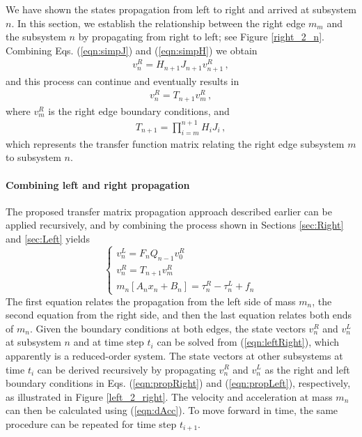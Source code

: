 \documentclass[11pt]{ucthesis}
\newcommand{\beq}{\begin{equation}}
\newcommand{\eeq}{\end{equation}}
\begin{document}
We have shown the states propagation from left to right and arrived at subsystem $n$. In this section, we establish the relationship between the right edge $m_m$ and the subsystem $n$ by propagating from right to left; see Figure \ref{right_2_n}. Combining Eqs. (\ref{eqn:simpJ}) and (\ref{eqn:simpH}) we obtain
\begin{eqnarray}
v_{n}^R = H_{n+1} J_{n+1} v_{n+1}^R \,,
\label{eqn:propLeft}
\end{eqnarray}
and this process can continue and eventually results in
\begin{eqnarray}
v_{n}^R = T_{n+1} v_m^R \,,
\label{eqn:propT}
\end{eqnarray}
where $v_m^R$ is the right edge boundary conditions, and
\begin{eqnarray}
T_{n+1} = \prod_{i = m}^{n+1} H_{i} J_{i} \,,
\end{eqnarray}
which represents the transfer function matrix relating the right edge subsystem $m$ to subsystem $n$.

\paragraph{Combining left and right propagation}
\label{sec:sim}

The proposed transfer matrix propagation approach described earlier can be applied recursively, and by combining the process shown in Sections \ref{sec:Right} and \ref{sec:Left} yields
\beq  \label{eqn:leftRight}
\left \{ 
\begin{array}{l}
v_n^L = F_n Q_{n-1} v_0^R\\
v_{n}^R = T_{n+1} v_m^R\\
m_n \left [ A_n x_n+ B_n \right ] = \tau_n^R-\tau_n^L +f_n
\end{array}
\right .
\eeq
The first equation relates the propagation from the left side of mass $m_n$, the second equation from the right side, and then the last equation relates both ends of $m_n$. Given the boundary conditions at both edges, the state vectors $v_n^R$ and $v_n^L$ at subsystem $n$ and at time step $t_i$ can be solved from (\ref{eqn:leftRight}), which apparently is a reduced-order system. The state vectors at other subsystems at time $t_i$ can be derived recursively by propagating $v_n^R$ and $v_n^L$ as the right and left boundary conditions in Eqs. (\ref{eqn:propRight}) and (\ref{eqn:propLeft}), respectively, as illustrated in Figure \ref{left_2_right}. The velocity and acceleration at mass $m_n$ can then be calculated using (\ref{eqn:dAcc}). To move forward in time, the same procedure can be repeated for time step $t_{i+1}$. 
\end{document}
